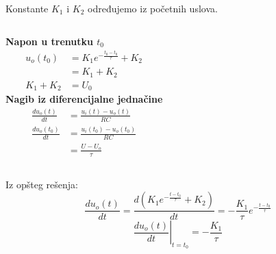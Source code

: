 \begin{frame}[label=08-s047]
\setlength{\parskip}{2pt}
\setlength{\abovedisplayskip}{4pt}\setlength{\belowdisplayskip}{4pt}
Konstante $K_1$ i $K_2$ određujemo iz početnih uslova.\par\smallskip
\begin{columns}[T,onlytextwidth]
\textbf{Napon u trenutku $t_0$}
\begin{align*}
u_o(t_0)&=K_1e^{-\frac{t_0-t_0}{\tau}}+K_2\\
&=K_1+K_2\\
K_1+K_2&=U_0
\end{align*}
\textbf{Nagib iz diferencijalne jednačine}
\begin{align*}
\frac{du_o(t)}{dt}&=\frac{u_i(t)-u_o(t)}{RC}\\
\frac{du_o(t_0)}{dt}&=\frac{u_i(t_0)-u_o(t_0)}{RC}\\
&=\frac{U-U_o}{\tau}
\end{align*}
\end{columns}\smallskip
Iz opšteg rešenja:
\[\frac{du_o(t)}{dt}=\frac{d\left(K_1e^{-\frac{t-t_0}{\tau}}+K_2\right)}{dt}=-\frac{K_1}{\tau}e^{-\frac{t-t_0}{\tau}}\]
\[\left.\frac{du_o(t)}{dt}\right|_{t=t_0}=-\frac{K_1}{\tau}\]
\end{frame}

